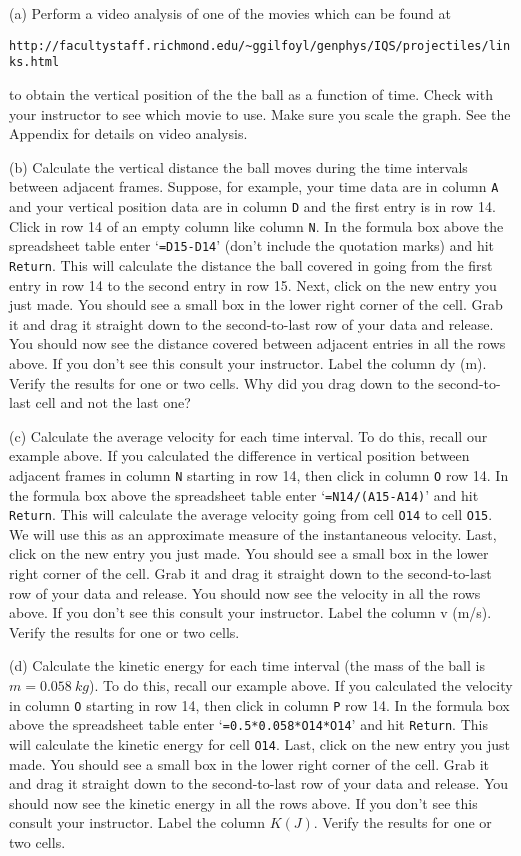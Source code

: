 (a) Perform a video analysis of one of the movies which can be found at

\verb!http://facultystaff.richmond.edu/~ggilfoyl/genphys/IQS/projectiles/links.html!

\noindent to obtain the vertical position of the the ball as a function of time. 
Check with your instructor to see which movie to use.
Make sure you scale the graph.
See the Appendix for details on video analysis.

(b) Calculate the vertical distance the ball moves during the time intervals between adjacent frames.
Suppose, for example, your time data are in column {\tt A} and your vertical position data are in 
column {\tt D} and the first entry is in row 14. 
Click in row 14 of an empty column like column {\tt N}.
In the formula box above the spreadsheet table enter `{\tt =D15-D14}' (don't include the quotation marks) and hit {\tt Return}.
This will calculate the distance the ball covered in going from the first entry in row 14 to the second entry in row 15.
Next, click on the new entry you just made. You should see a small box in the lower right corner of the cell.
Grab it and drag it straight down to the second-to-last row of your data and release.
You should now see the distance covered between adjacent entries in all the rows above. 
If you don't see this consult your instructor.
Label the column dy (m).
Verify the results for one or two cells.
Why did you drag down to the second-to-last cell and not the last one?

\vspace{1.0cm}

(c) Calculate the average velocity for each time interval. 
To do this, recall our example above.
If you calculated the difference in vertical position between adjacent frames in column {\tt N} starting in row 14, then
click in column {\tt O} row 14.
In the formula box above the spreadsheet table enter `{\tt =N14/(A15-A14)}' and hit {\tt Return}.
This will calculate the average velocity going from cell {\tt O14} to cell {\tt O15}.
We will use this as an approximate measure of the instantaneous velocity.
Last, click on the new entry you just made. You should see a small box in the lower right corner of the cell.
Grab it and drag it straight down to the second-to-last row of your data and release.
You should now see the velocity in all the rows above. If you don't see this consult your instructor.
Label the column v (m/s).
Verify the results for one or two cells.

(d) Calculate the kinetic energy for each time interval (the mass of the ball is $m=0.058~ kg$).
To do this, recall our example above.
If you calculated the velocity in column {\tt O} starting in row 14, then
click in column {\tt P} row 14.
In the formula box above the spreadsheet table enter `{\tt =0.5*0.058*O14*O14}' and hit {\tt Return}.
This will calculate the kinetic energy for cell {\tt O14}.
Last, click on the new entry you just made. You should see a small box in the lower right corner of the cell.
Grab it and drag it straight down to the second-to-last row of your data and release.
You should now see the kinetic energy in all the rows above. If you don't see this consult your instructor.
Label the column $K(J)$.
Verify the results for one or two cells.

